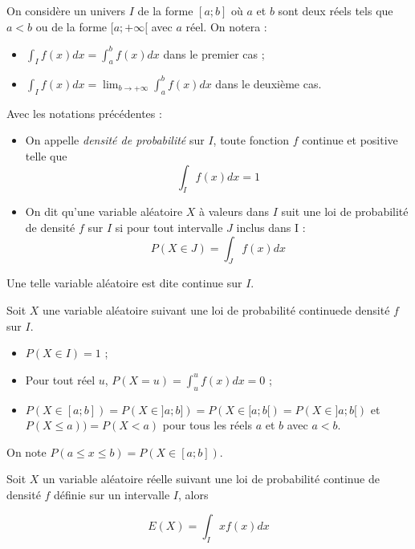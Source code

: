 \documentclass[french]{book}
\newcommand{\dx}{dx}
\begin{document}
\begin{rem}
 On considère un univers $I$ de la forme $[a;b]$ où $a$ et $b$ sont deux réels tels que $a<b$ ou de la forme $[a;+\infty[$ avec $a$ réel. 
On notera :
\begin{itemize}
 \item[$\bullet$] $\int_{I}f(x)\dx=\int_a^bf (x)\dx$ dans le premier cas ;
  \item[$\bullet$] $\int_{I}f(x)\dx=\lim_{b\rightarrow +\infty}\int_{a}^{b}f(x)\dx$ dans le deuxième cas.
\end{itemize}
\end{rem}


\begin{defn}
Avec les notations précédentes :
\begin{itemize}
\item[$\bullet$] On appelle \emph{densité de probabilité} sur $I$, toute fonction $f$ continue et positive telle que 
$$\int_{I}f(x)\dx=1$$
\item[$\bullet$] On dit qu'une variable aléatoire $X$ à valeurs dans $I$ suit une loi de probabilité de densité $f$ sur $I$ si pour tout intervalle $J$ inclus dans I : 
$$P(X\in J)=\int_{J}f(x)\dx$$
\end{itemize}
Une telle variable aléatoire est dite continue sur $I$.
\end{defn}

\begin{prop}
 Soit $X$ une variable aléatoire suivant une loi de probabilité continuede densité $f$ sur $I$.
\begin{itemize}
 \item[$\bullet$] $P(X\in I)=1$ ;
\item[$\bullet$] Pour tout réel $u$, $P(X=u)=\int_{u}^{u}f(x)\dx=0$ ;
\item[$\bullet$] $P(X\in[a;b])=P(X\in]a;b])=P(X\in[a;b[)=P(X\in]a;b[)$ et $P(X\leq a))=P(X<a)$ pour tous les réels $a$ et $b$ avec $a<b$.
\end{itemize}

\end{prop}

\begin{rem}
 On note $P(a\leq x\leq b)=P(X\in [a;b])$.
\end{rem}

\begin{defn}
Soit $X$ un variable aléatoire réelle suivant une loi de probabilité continue de densité $f$ définie sur un intervalle $I$, alors 

$$E(X)= \int_{I}xf(x)\dx$$
\end{defn}
\end{document}

